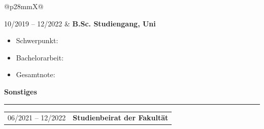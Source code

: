 \documentclass[10pt,a4paper]{article}
\makeatletter
\newcommand{\sectiontitle}[1]{\vspace{1.0em}\textbf{\large #1}\par\vspace{0.25em}\hrule\vspace{0.6em}}
\newcommand{\cventry}[3]{%
  \noindent
  \begin{tabularx}{\linewidth}{@{}p{28mm}X@{}}
    \raggedright\small\textsf{#1} & \textbf{#2} \\
  \end{tabularx}
  \vspace{0.2em}
  #3
  \vspace{0.8em}
}
\makeatother
\begin{document}
\begin{paracol}{2}
{\cventry{10/2019 -- 12/2022}{B.Sc. Studiengang, Uni}{%
\begin{itemize}
  \item Schwerpunkt: 
  \item Bachelorarbeit:
  \item Gesamtnote: 
\end{itemize} } %
} %

{\small
{}

\sectiontitle{Sonstiges}

\cventry{06/2021 -- 12/2022}{Studienbeirat der Fakultät}{%
} %

} %



\end{paracol}
\end{document}
